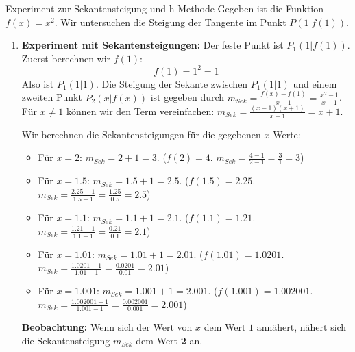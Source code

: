 \begin{loesungsumgebung}{Experiment zur Sekantensteigung und h-Methode}
Gegeben ist die Funktion $f(x) = x^2$. Wir untersuchen die Steigung der Tangente im Punkt $P(1|f(1))$.

\begin{enumerate}[label=(\alph*)]
    \item \textbf{Experiment mit Sekantensteigungen:}
    Der feste Punkt ist $P_1(1|f(1))$. Zuerst berechnen wir $f(1)$:
    $$ f(1) = 1^2 = 1 $$
    Also ist $P_1(1|1)$.
    Die Steigung der Sekante zwischen $P_1(1|1)$ und einem zweiten Punkt $P_2(x|f(x))$ ist gegeben durch $m_{Sek} = \frac{f(x)-f(1)}{x-1} = \frac{x^2-1}{x-1}$.
    Für $x \neq 1$ können wir den Term vereinfachen: $m_{Sek} = \frac{(x-1)(x+1)}{x-1} = x+1$.

    Wir berechnen die Sekantensteigungen für die gegebenen $x$-Werte:
    \begin{itemize}
        \item Für $x = 2$: $m_{Sek} = 2+1 = 3$.
        ($f(2)=4$. $m_{Sek} = \frac{4-1}{2-1} = \frac{3}{1} = 3$)
        \item Für $x = 1.5$: $m_{Sek} = 1.5+1 = 2.5$.
        ($f(1.5)=2.25$. $m_{Sek} = \frac{2.25-1}{1.5-1} = \frac{1.25}{0.5} = 2.5$)
        \item Für $x = 1.1$: $m_{Sek} = 1.1+1 = 2.1$.
        ($f(1.1)=1.21$. $m_{Sek} = \frac{1.21-1}{1.1-1} = \frac{0.21}{0.1} = 2.1$)
        \item Für $x = 1.01$: $m_{Sek} = 1.01+1 = 2.01$.
        ($f(1.01)=1.0201$. $m_{Sek} = \frac{1.0201-1}{1.01-1} = \frac{0.0201}{0.01} = 2.01$)
        \item Für $x = 1.001$: $m_{Sek} = 1.001+1 = 2.001$.
        ($f(1.001)=1.002001$. $m_{Sek} = \frac{1.002001-1}{1.001-1} = \frac{0.002001}{0.001} = 2.001$)
    \end{itemize}
    \textbf{Beobachtung:} Wenn sich der Wert von $x$ dem Wert $1$ annähert, nähert sich die Sekantensteigung $m_{Sek}$ dem Wert \textbf{2} an.


\end{enumerate}
\end{loesungsumgebung}
